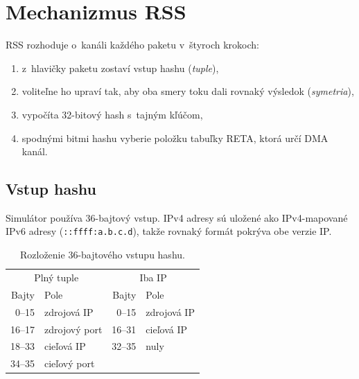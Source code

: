 \chapter{Mechanizmus RSS}
\label{chap:rss}

RSS rozhoduje o~kanáli každého paketu v~štyroch krokoch:

\begin{enumerate}
  \item z~hlavičky paketu zostaví vstup hashu (\emph{tuple}),
  \item voliteľne ho upraví tak, aby oba smery toku dali rovnaký výsledok (\emph{symetria}),
  \item vypočíta 32-bitový hash s~tajným kľúčom,
  \item spodnými bitmi hashu vyberie položku tabuľky RETA, ktorá určí DMA kanál.
\end{enumerate}


\section{Vstup hashu}
\label{sec:tuple}

Simulátor používa 36-bajtový vstup. IPv4 adresy sú uložené ako IPv4-mapované IPv6 adresy
(\texttt{::ffff:a.b.c.d}), takže rovnaký formát pokrýva obe verzie IP.

\begin{table}[ht]
  \centering
  \small
  \caption{Rozloženie 36-bajtového vstupu hashu.}
  \label{tab:tuple}
  \begin{tabular}{r l @{\qquad} r l}
    \toprule
    \multicolumn{2}{c}{Plný tuple} & \multicolumn{2}{c}{Iba IP} \\
    Bajty & Pole & Bajty & Pole \\
    \midrule
    0--15  & zdrojová IP   & 0--15  & zdrojová IP \\
    16--17 & zdrojový port & 16--31 & cieľová IP \\
    18--33 & cieľová IP    & 32--35 & nuly \\
    34--35 & cieľový port  &        & \\
    \bottomrule
  \end{tabular}
\end{table}

